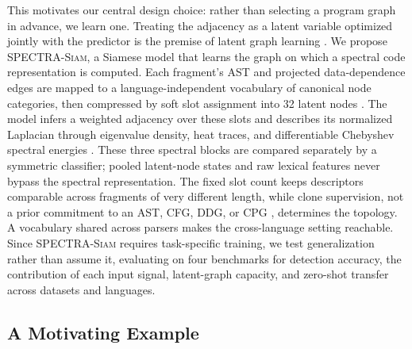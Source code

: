 \documentclass[final,5p,times,twocolumn]{elsarticle}
\newcommand{\method}{\textsc{SPECTRA-Siam}}
\theoremstyle{plain}
\begin{document}
{This motivates our central design choice: rather than selecting a program graph in advance, we learn one. Treating the adjacency as a latent variable optimized jointly with the predictor is the premise of latent graph learning \cite{kipf2018nri,franceschi2019lds,chen2020idgl,zhu2021gslsurvey,saha2023adaptive}. We propose \method{}, a Siamese model that learns the graph on which a spectral code representation is computed. Each fragment's AST and projected data-dependence edges are mapped to a language-independent vocabulary of canonical node categories, then compressed by soft slot assignment into 32 latent nodes \cite{ying2018diffpool}. The model infers a weighted adjacency over these slots and describes its normalized Laplacian through eigenvalue density, heat traces, and differentiable Chebyshev spectral energies \cite{chung1997spectral,defferrard2016cnngraph}. These three spectral blocks are compared separately by a symmetric classifier; pooled latent-node states and raw lexical features never bypass the spectral representation. The fixed slot count keeps descriptors comparable across fragments of very different length, while clone supervision, not a prior commitment to an AST, CFG, DDG, or CPG \cite{yamaguchi2014cpg}, determines the topology. A vocabulary shared across parsers makes the cross-language setting reachable. Since \method{} requires task-specific training, we test generalization rather than assume it, evaluating on four benchmarks for detection accuracy, the contribution of each input signal, latent-graph capacity, and zero-shot transfer across datasets and languages.}



\subsection{A Motivating Example}
\label{sec:motivating_exp}
\end{document}
